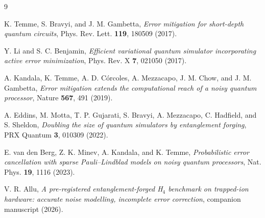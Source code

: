 \documentclass[aps,prx,twocolumn,superscriptaddress,nofootinbib,floatfix]{revtex4-2}
\begin{document}
\begin{thebibliography}{9}

 K. Temme, S. Bravyi, and J. M. Gambetta,
\emph{Error mitigation for short-depth quantum circuits},
Phys. Rev. Lett. \textbf{119}, 180509 (2017).

 Y. Li and S. C. Benjamin, \emph{Efficient variational
quantum simulator incorporating active error minimization},
Phys. Rev. X \textbf{7}, 021050 (2017).

 A. Kandala, K. Temme, A. D. C\'orcoles,
A. Mezzacapo, J. M. Chow, and J. M. Gambetta, \emph{Error mitigation
extends the computational reach of a noisy quantum processor},
Nature \textbf{567}, 491 (2019).

 A. Eddins, M. Motta, T. P. Gujarati, S. Bravyi,
A. Mezzacapo, C. Hadfield, and S. Sheldon, \emph{Doubling the size of
quantum simulators by entanglement forging}, PRX Quantum \textbf{3},
010309 (2022).

 E. van den Berg, Z. K. Minev, A. Kandala, and
K. Temme, \emph{Probabilistic error cancellation with sparse
Pauli--Lindblad models on noisy quantum processors},
Nat. Phys. \textbf{19}, 1116 (2023).

 V. R. Allu, \emph{A pre-registered
entanglement-forged H$_4$ benchmark on trapped-ion hardware: accurate
noise modelling, incomplete error correction}, companion manuscript
(2026).

\end{thebibliography}
\end{document}
